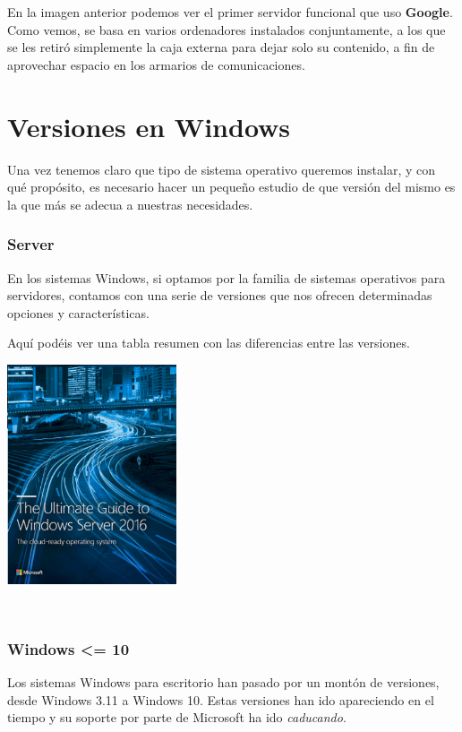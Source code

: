 \documentclass[11pt]{article}
\begin{document}
En la imagen anterior podemos ver el primer servidor funcional que uso
\textbf{Google}. Como vemos, se basa en varios ordenadores instalados
conjuntamente, a los que se les retiró simplemente la caja externa para
dejar solo su contenido, a fin de aprovechar espacio en los armarios de
comunicaciones.


\section{Versiones en Windows}
\label{sec:org613d0e6}
Una vez tenemos claro que tipo de sistema operativo queremos instalar, y
con qué propósito, es necesario hacer un pequeño estudio de que versión
del mismo es la que más se adecua a nuestras necesidades.

\subsubsection{Server}
\label{sec:orgba9177c}
En los sistemas Windows, si optamos por la familia de sistemas
operativos para servidores, contamos con una serie de versiones que nos
ofrecen determinadas opciones y características.

Aquí podéis ver una tabla resumen con las diferencias entre las
versiones.

\begin{center}
\includegraphics[width=5cm]{Versiones/WindowsServer_cover.png}
\end{center}  

\subsubsection{Windows <= 10}
\label{sec:orge3e2405}
Los sistemas Windows para escritorio han pasado por un montón de
versiones, desde Windows 3.11 a Windows 10. Estas versiones han ido
apareciendo en el tiempo y su soporte por parte de Microsoft ha ido
\emph{caducando}.
\end{document}

